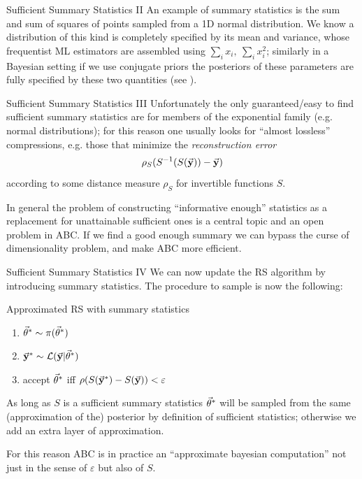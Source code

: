 \documentclass{beamer}
\theoremstyle{remark}
\renewcommand{\L}{\mathcal{L}}
\begin{document}
\begin{frame}{Sufficient Summary Statistics II}
An example of summary statistics is the sum and sum of squares of points sampled from a 1D normal distribution. We know a distribution of this kind is completely specified by its mean and variance, whose frequentist ML estimators are assembled using $\sum_i x_i, \ \sum_i x_i^2$; similarly in a Bayesian setting if we use conjugate priors the posteriors of these parameters are fully specified by these two quantities (see \cite{conj_priors}).
\end{frame}

\begin{frame}{Sufficient Summary Statistics III}
Unfortunately the only guaranteed/easy to find sufficient summary statistics are for members of the exponential family (e.g. normal distributions); for this reason one usually looks for ``almost lossless'' compressions, e.g. those that minimize the \emph{reconstruction error}
\begin{equation*}
    \rho_S(S^{-1}(S(\va{y}))-\va{y})
\end{equation*}
according to some distance measure $\rho_S$ for invertible functions $S$.

\pause
In general the problem of constructing ``informative enough'' statistics as a replacement for unattainable sufficient ones is a central topic and an open problem in ABC. If we find a good enough summary we can bypass the curse of dimensionality problem, and make ABC more efficient.
\end{frame}

\begin{frame}{Sufficient Summary Statistics IV}
We can now update the RS algorithm by introducing summary statistics. The procedure to sample is now the following:\pause
\begin{block}{Approximated RS with summary statistics}
\begin{enumerate}
    \item $\va{\theta}^*\sim \pi(\va{\theta}^*)$
    \item $\va{y}^*\sim \L(\va{y}|\va{\theta}^*)$
    \item accept $\va{\theta}^*$ iff $\rho(S(\va{y}^*) - S(\va{y})) < \varepsilon$
\end{enumerate}
As long as $S$ is a sufficient summary statistics $\va{\theta}^*$ will be sampled from the same (approximation of the) posterior by definition of sufficient statistics; otherwise we add an extra layer of approximation.
\end{block}\pause
For this reason ABC is in practice an ``approximate bayesian computation'' not just in the sense of $\varepsilon$ but also of $S$.
\end{frame}
\end{document}
